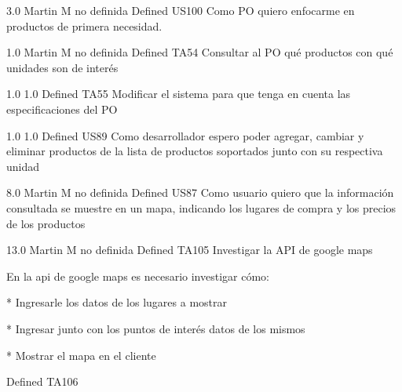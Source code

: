 	{3.0} %
	{Martin M} %
	{no definida} %
	{Defined} %
\userStory
	{US100} %
	{Como PO quiero enfocarme en productos de primera necesidad.} %
	{

} %
	{} %
	{1.0} %
	{Martin M} %
	{no definida} %
	{Defined} %
	\task
		{TA54} %
		{Consultar al PO qué productos con qué unidades son de interés} %
		{

} %
		{1.0} %
		{} %
		{1.0} %
		{Defined} %
	\task
		{TA55} %
		{Modificar el sistema para que tenga en cuenta las especificaciones del PO} %
		{

} %
		{1.0} %
		{} %
		{1.0} %
		{Defined} %
\userStory
	{US89} %
	{Como desarrollador espero poder agregar, cambiar y eliminar productos de la lista de productos soportados junto con su respectiva unidad} %
	{

} %
	{} %
	{8.0} %
	{Martin M} %
	{no definida} %
	{Defined} %
\userStory
	{US87} %
	{Como usuario quiero que la información consultada se muestre en un mapa, indicando los lugares de compra y los precios de los productos} %
	{

} %
	{} %
	{13.0} %
	{Martin M} %
	{no definida} %
	{Defined} %
	\task
		{TA105} %
		{Investigar la API de google maps} %
		{En la api de google maps es necesario investigar cómo:

  

* Ingresarle los datos de los lugares a mostrar

* Ingresar junto con los puntos de interés datos de los mismos

* Mostrar el mapa en el cliente

} %
		{} %
		{} %
		{} %
		{Defined} %
	\task
		{TA106} %
